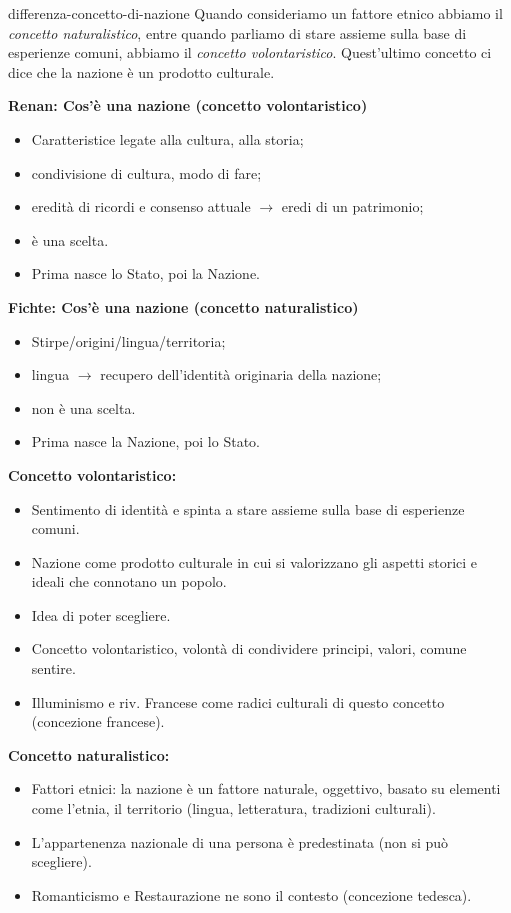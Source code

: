 \documentclass[preview]{standalone}
\begin{document}
\begin{snippet}{differenza-concetto-di-nazione}
    Quando consideriamo un fattore etnico abbiamo il \textit{concetto naturalistico},
    entre quando parliamo di stare assieme sulla base di esperienze comuni, abbiamo il \textit{concetto volontaristico}.
    Quest'ultimo concetto ci dice che la nazione è un prodotto culturale.

    \textbf{Renan: Cos'è una nazione (concetto volontaristico)}
    \begin{itemize}
        \item Caratteristice legate alla cultura, alla storia;
        \item condivisione di cultura, modo di fare;
        \item eredità di ricordi e consenso attuale \(\rightarrow\) eredi di un patrimonio;
        \item è una scelta.
        \item Prima nasce lo Stato, poi la Nazione.
    \end{itemize}

    \textbf{Fichte: Cos'è una nazione (concetto naturalistico)}
    \begin{itemize}
        \item Stirpe/origini/lingua/territoria;
        \item lingua \(\rightarrow\) recupero dell'identità originaria della nazione;
        \item non è una scelta.
        \item Prima nasce la Nazione, poi lo Stato.
    \end{itemize}

    \textbf{Concetto volontaristico:}
    \begin{itemize}
        \item Sentimento di identità e spinta a stare assieme sulla base di esperienze comuni.
        \item Nazione come prodotto culturale in cui si valorizzano gli aspetti storici e ideali che connotano un popolo.
        \item Idea di poter scegliere.
        \item Concetto volontaristico, volontà di condividere principi, valori, comune sentire.
        \item Illuminismo e riv. Francese come radici culturali di questo concetto (concezione francese).
    \end{itemize}

    \textbf{Concetto naturalistico:}
    \begin{itemize}
        \item Fattori etnici: la nazione è un fattore naturale, oggettivo, basato su elementi come l'etnia, il territorio (lingua, letteratura, tradizioni culturali).
        \item L'appartenenza nazionale di una persona è predestinata (non si può scegliere).
        \item Romanticismo e Restaurazione ne sono il contesto (concezione tedesca).
    \end{itemize}
\end{snippet}
\end{document}
